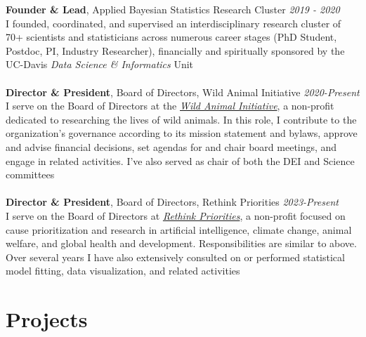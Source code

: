 \documentclass[12pt]{article}
\begin{document}
\textbf{Founder \& Lead}, Applied Bayesian Statistics Research Cluster \hfill \emph{2019 - 2020}\\
I founded, coordinated, and supervised an interdisciplinary research cluster of 70+ scientists and statisticians across numerous career stages (PhD Student, Postdoc, PI, Industry Researcher), financially and spiritually sponsored by the UC-Davis \emph{Data Science \& Informatics} Unit\\\\
\textbf{Director \& President}, Board of Directors, Wild Animal Initiative \hfill \emph{2020-Present}\\
I serve on the Board of Directors at the \textit{\href{https://www.wildanimalinitiative.org/}{Wild Animal Initiative}}, a non-profit dedicated to researching the lives of wild animals. In this role, I contribute to the organization's governance according to its mission statement and bylaws, approve and advise financial decisions, set agendas for and chair board meetings, and engage in related activities.  I've also served as chair of both the DEI and Science committees\\\\
\textbf{Director \& President}, Board of Directors, Rethink Priorities \hfill \emph{2023-Present}\\
I serve on the Board of Directors at \textit{\href{https://rethinkpriorities.org/}{Rethink Priorities}}, a non-profit focused on cause prioritization and research in artificial intelligence, climate change, animal welfare, and global health and development. Responsibilities are similar to above. Over several years I have also extensively consulted on or performed statistical model fitting, data visualization, and related activities

\section{Projects}
\end{document}
